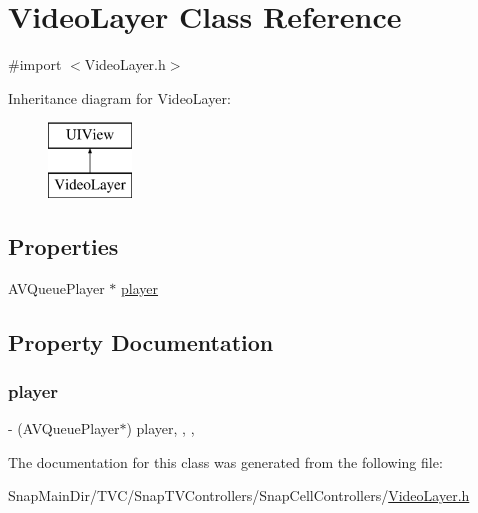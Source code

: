 \hypertarget{interface_video_layer}{}\section{Video\+Layer Class Reference}
\label{interface_video_layer}


{\ttfamily \#import $<$Video\+Layer.\+h$>$}

Inheritance diagram for Video\+Layer\+:\begin{figure}[H]
\begin{center}
\leavevmode
\includegraphics[height=2.000000cm]{interface_video_layer}
\end{center}
\end{figure}
\subsection*{Properties}
\begin{DoxyCompactItemize}
\item 
A\+V\+Queue\+Player $\ast$ \hyperlink{interface_video_layer_a311302d5daf11ea2d79759d0059e12b7}{player}
\end{DoxyCompactItemize}


\subsection{Property Documentation}
\hypertarget{interface_video_layer_a311302d5daf11ea2d79759d0059e12b7}{}\label{interface_video_layer_a311302d5daf11ea2d79759d0059e12b7} 
\subsubsection{\texorpdfstring{player}{player}}
{\footnotesize\ttfamily -\/ (A\+V\+Queue\+Player$\ast$) player\hspace{0.3cm}{\ttfamily [read]}, {\ttfamily [write]}, {\ttfamily [nonatomic]}, {\ttfamily [strong]}}



The documentation for this class was generated from the following file\+:\begin{DoxyCompactItemize}
\item 
Snap\+Main\+Dir/\+T\+V\+C/\+Snap\+T\+V\+Controllers/\+Snap\+Cell\+Controllers/\hyperlink{_video_layer_8h}{Video\+Layer.\+h}\end{DoxyCompactItemize}

